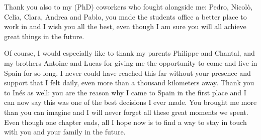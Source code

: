 \documentclass[a4paper, 10pt, openright]{report}
\begin{document}
Thank you also to my (PhD) coworkers who fought alongside me: Pedro, Nicol\`{o}, Celia, Clara, Andrea and Pablo, you made the students office a better place to work in and I wish you all the best, even though I am sure you will all achieve great things in the future.

Of course, I would especially like to thank my parents Philippe and Chantal, and my brothers Antoine and Lucas for giving me the opportunity to come and live in Spain for so long. I never could have reached this far without your presence and support that I felt daily, even more than a thousand kilometers away. Thank you to In\'{e}s as well: you are the reason why I came to Spain in the first place and I can now say this was one of the best decisions I ever made. You brought me more than you can imagine and I will never forget all these great moments we spent. Even though one chapter ends, all I hope now is to find a way to stay in touch with you and your family in the future.

\newpage

%
\end{document}
